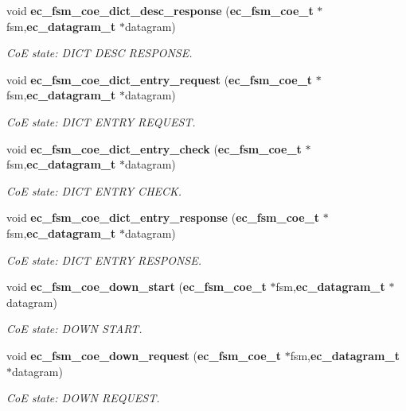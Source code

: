 \begin{DoxyCompactItemize}
void {\bf ec\-\_\-fsm\-\_\-coe\-\_\-dict\-\_\-desc\-\_\-response} ({\bf ec\-\_\-fsm\-\_\-coe\-\_\-t} $\ast$fsm,{\bf ec\-\_\-datagram\-\_\-t} $\ast$datagram)
\begin{DoxyCompactList}\small\item\em Co\-E state\-: D\-I\-C\-T D\-E\-S\-C R\-E\-S\-P\-O\-N\-S\-E. \end{DoxyCompactList}\item 
void {\bf ec\-\_\-fsm\-\_\-coe\-\_\-dict\-\_\-entry\-\_\-request} ({\bf ec\-\_\-fsm\-\_\-coe\-\_\-t} $\ast$fsm,{\bf ec\-\_\-datagram\-\_\-t} $\ast$datagram)
\begin{DoxyCompactList}\small\item\em Co\-E state\-: D\-I\-C\-T E\-N\-T\-R\-Y R\-E\-Q\-U\-E\-S\-T. \end{DoxyCompactList}\item 
void {\bf ec\-\_\-fsm\-\_\-coe\-\_\-dict\-\_\-entry\-\_\-check} ({\bf ec\-\_\-fsm\-\_\-coe\-\_\-t} $\ast$fsm,{\bf ec\-\_\-datagram\-\_\-t} $\ast$datagram)
\begin{DoxyCompactList}\small\item\em Co\-E state\-: D\-I\-C\-T E\-N\-T\-R\-Y C\-H\-E\-C\-K. \end{DoxyCompactList}\item 
void {\bf ec\-\_\-fsm\-\_\-coe\-\_\-dict\-\_\-entry\-\_\-response} ({\bf ec\-\_\-fsm\-\_\-coe\-\_\-t} $\ast$fsm,{\bf ec\-\_\-datagram\-\_\-t} $\ast$datagram)
\begin{DoxyCompactList}\small\item\em Co\-E state\-: D\-I\-C\-T E\-N\-T\-R\-Y R\-E\-S\-P\-O\-N\-S\-E. \end{DoxyCompactList}\item 
void {\bf ec\-\_\-fsm\-\_\-coe\-\_\-down\-\_\-start} ({\bf ec\-\_\-fsm\-\_\-coe\-\_\-t} $\ast$fsm,{\bf ec\-\_\-datagram\-\_\-t} $\ast$datagram)
\begin{DoxyCompactList}\small\item\em Co\-E state\-: D\-O\-W\-N S\-T\-A\-R\-T. \end{DoxyCompactList}\item 
void {\bf ec\-\_\-fsm\-\_\-coe\-\_\-down\-\_\-request} ({\bf ec\-\_\-fsm\-\_\-coe\-\_\-t} $\ast$fsm,{\bf ec\-\_\-datagram\-\_\-t} $\ast$datagram)
\begin{DoxyCompactList}\small\item\em Co\-E state\-: D\-O\-W\-N R\-E\-Q\-U\-E\-S\-T. \end{DoxyCompactList}\item 

\end{DoxyCompactItemize}
